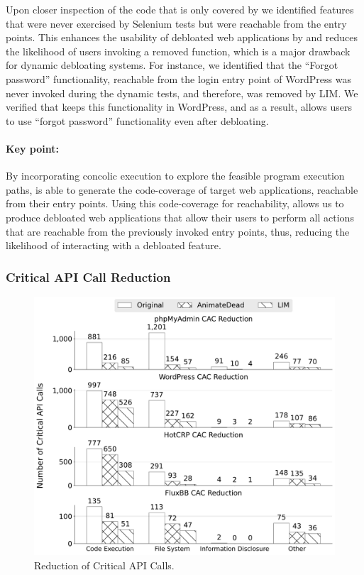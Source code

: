 {%

Upon closer inspection of the code that is only covered by \animatedead{} we identified features that were never exercised by Selenium tests but were reachable from the entry points. 
This enhances the usability of debloated web applications by \animatedead{} and reduces the likelihood of users invoking a removed function, which is a major drawback for dynamic debloating systems. 
For instance, we identified that the ``Forgot password'' functionality, reachable from the login entry point of WordPress was never invoked during the dynamic tests, and therefore, was removed by LIM. 
We verified that \animatedead{} keeps this functionality in WordPress, and as a result, allows users to use ``forgot password'' functionality even after debloating. 

\paragraph{Key point:} 
By incorporating concolic execution to explore the feasible program execution paths, \animatedead{} is able to generate the code-coverage of target web applications, reachable from their entry points. 
Using this code-coverage for reachability, allows us to produce debloated web applications that allow their users to perform all actions that are reachable from the previously invoked entry points, thus, reducing the likelihood of interacting with a debloated feature. 

\subsubsection*{Critical API Call Reduction}

\begin{figure}[t]
    \centering
    \includegraphics[width=0.8\linewidth]{figures/ad/cac_reduction_bw.pdf}
    \caption{Reduction of Critical API Calls.}
    \label{fig:cac_reduction}
\end{figure}

}
